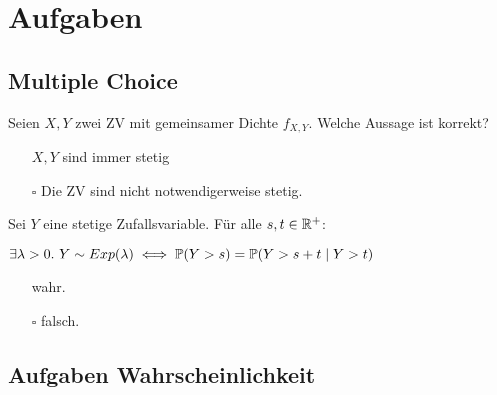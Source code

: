\section{Aufgaben}
\subsection{Multiple Choice}

Seien \(X,Y\) zwei ZV mit gemeinsamer Dichte \(f_{X,Y}\). Welche Aussage ist korrekt?
\begin{itemize}
	\item[\checkmark] \(X,Y\) sind immer stetig
	\item[\(\square\)] Die ZV sind nicht notwendigerweise stetig.
\end{itemize}

Sei $Y$ eine stetige Zufallsvariable. Für alle $s, t \in \R^+$:

$\exists \lambda > 0. \ Y \sim Exp(\lambda) \iff \P(Y > s) = \P(Y > s + t \mid Y > t)$ 
\begin{itemize}
	\item[\checkmark] wahr.
	\item[\(\square\)] falsch.
\end{itemize}




\subsection{Aufgaben Wahrscheinlichkeit}
